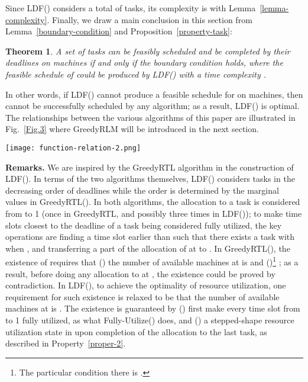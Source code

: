 \documentclass[10pt,journal,compsoc]{IEEEtran}
\newtheorem{theorem}{\textbf{Theorem}}\newtheorem{definition}{\textbf{Definition}}\newtheorem{feature}{Feature}\newtheorem{proposition}{\textbf{Proposition}}\newtheorem{lemma}{Lemma}\newtheorem{assumption}{Assumption}\newtheorem{principle}{\textbf{Principle}}\newtheorem{observation}{\textbf{{\em Observation}}}\newtheorem{property}{\textbf{{\em Property}}}
\newcommand{\rmnum}[1]{\romannumeral #1}
\begin{document}
Since LDF() considers a total of  tasks, its complexity is  with Lemma~\ref{lemma-complexity}. Finally, we draw a main conclusion in this section from Lemma~\ref{boundary-condition} and Proposition~\ref{property-task}:

\begin{theorem}\label{main-theorem}
A set of tasks  can be feasibly scheduled and be completed by their deadlines on  machines {\em if and only if} the boundary condition holds, where the feasible schedule of  could be produced by LDF() with a time complexity .
\end{theorem}

In other words, if LDF() cannot produce a feasible schedule for  on  machines, then  cannot be successfully scheduled by any algorithm; as a result, LDF() is optimal. The relationships between the various algorithms of this paper are illustrated in Fig.~\ref{Fig.3} where GreedyRLM will be introduced in the next section. 




\begin{figure*}[!ht]
\centering

\texttt{[image: function-relation-2.png]}

  \caption{Relationship among Algorithms: for , the blue and green arrows denote the relations that the algorithm  calls , and, the algorithm  is executed upon completion of .}\label{Fig.3}
\end{figure*}






\vspace{0.2em}\noindent\textbf{Remarks.} We are inspired by the GreedyRTL algorithm \cite{Jain} in the construction of LDF(). In terms of the two algorithms themselves, LDF() considers tasks in the decreasing order of deadlines while the order is determined by the marginal values in GreedyRTL(). In both algorithms, the allocation to a task  is considered from  to 1 (once in GreedyRTL, and possibly three times in LDF()); to make time slots  closest to the deadline of a task  being considered fully utilized, the key operations are finding a time slot  earlier than  such that there exists a task  with  when , and transferring a part of the allocation of  at  to . In GreedyRTL(), the existence of  requires that (\rmnum{1}) the number  of available machines at  is  and (\rmnum{2})\footnote{The particular condition there is .} ; as a result, before doing any allocation to  at , the existence could be proved by contradiction. In LDF(), to achieve the optimality of resource utilization, one requirement for such existence is relaxed to be that the number of available machines at  is . The existence is guaranteed by (\rmnum{1}) first make every time slot from  to 1 fully utilized, as what Fully-Utilize() does, and (\rmnum{2}) a stepped-shape resource utilization state in  upon completion of the allocation to the last task, as described in Property~\ref{proper-2}.
\end{document}
